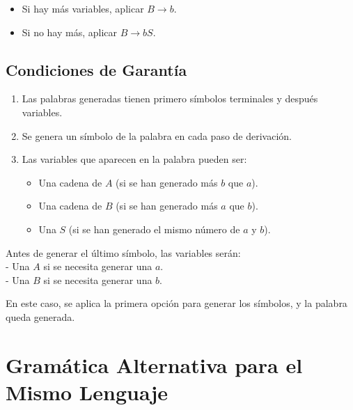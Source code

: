 \documentclass[12pt]{book} %
\providecommand{\tightlist}{%
  \setlength{\itemsep}{0pt}\setlength{\parskip}{0pt}}
\begin{document}
\begin{itemize}
\begin{itemize}
\begin{itemize}
      \begin{itemize}
      \tightlist
      \item
        Si hay más variables, aplicar \(B \to b\).\\
      \item
        Si no hay más, aplicar \(B \to bS\).
      \end{itemize}
    \end{itemize}
  \end{itemize}
\end{itemize}

\hypertarget{condiciones-de-garantuxeda}{%
\subsection{Condiciones de Garantía}\label{condiciones-de-garantuxeda}}

\begin{enumerate}
\def\labelenumi{\arabic{enumi}.}
\tightlist
\item
  Las palabras generadas tienen primero símbolos terminales y después
  variables.\\
\item
  Se genera un símbolo de la palabra en cada paso de derivación.\\
\item
  Las variables que aparecen en la palabra pueden ser:

  \begin{itemize}
  \tightlist
  \item
    Una cadena de \(A\) (si se han generado más \(b\) que \(a\)).\\
  \item
    Una cadena de \(B\) (si se han generado más \(a\) que \(b\)).\\
  \item
    Una \(S\) (si se han generado el mismo número de \(a\) y \(b\)).
  \end{itemize}
\end{enumerate}

Antes de generar el último símbolo, las variables serán:\\
- Una \(A\) si se necesita generar una \(a\).\\
- Una \(B\) si se necesita generar una \(b\).

En este caso, se aplica la primera opción para generar los símbolos, y
la palabra queda generada.

\hypertarget{gramuxe1tica-alternativa-para-el-mismo-lenguaje}{%
\section{Gramática Alternativa para el Mismo
Lenguaje}\label{gramuxe1tica-alternativa-para-el-mismo-lenguaje}}
\end{document}
